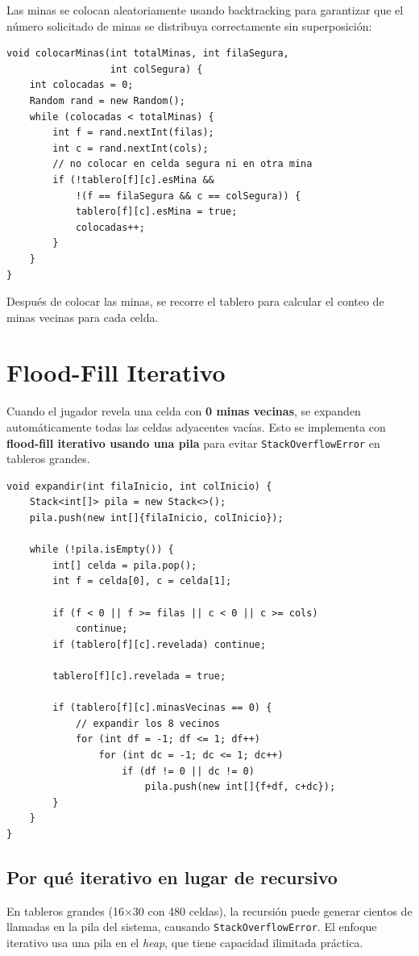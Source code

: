 \documentclass[12pt,a4paper]{article}
\begin{document}
Las minas se colocan aleatoriamente usando backtracking para garantizar que el número solicitado de minas se distribuya correctamente sin superposición:

\begin{lstlisting}
void colocarMinas(int totalMinas, int filaSegura,
                  int colSegura) {
    int colocadas = 0;
    Random rand = new Random();
    while (colocadas < totalMinas) {
        int f = rand.nextInt(filas);
        int c = rand.nextInt(cols);
        // no colocar en celda segura ni en otra mina
        if (!tablero[f][c].esMina &&
            !(f == filaSegura && c == colSegura)) {
            tablero[f][c].esMina = true;
            colocadas++;
        }
    }
}
\end{lstlisting}

Después de colocar las minas, se recorre el tablero para calcular el conteo de minas vecinas para cada celda.

\section{Flood-Fill Iterativo}

Cuando el jugador revela una celda con \textbf{0 minas vecinas}, se expanden automáticamente todas las celdas adyacentes vacías. Esto se implementa con \textbf{flood-fill iterativo usando una pila} para evitar \texttt{StackOverflowError} en tableros grandes.

\begin{lstlisting}
void expandir(int filaInicio, int colInicio) {
    Stack<int[]> pila = new Stack<>();
    pila.push(new int[]{filaInicio, colInicio});

    while (!pila.isEmpty()) {
        int[] celda = pila.pop();
        int f = celda[0], c = celda[1];

        if (f < 0 || f >= filas || c < 0 || c >= cols)
            continue;
        if (tablero[f][c].revelada) continue;

        tablero[f][c].revelada = true;

        if (tablero[f][c].minasVecinas == 0) {
            // expandir los 8 vecinos
            for (int df = -1; df <= 1; df++)
                for (int dc = -1; dc <= 1; dc++)
                    if (df != 0 || dc != 0)
                        pila.push(new int[]{f+df, c+dc});
        }
    }
}
\end{lstlisting}

\subsection{Por qué iterativo en lugar de recursivo}
En tableros grandes (16×30 con 480 celdas), la recursión puede generar cientos de llamadas en la pila del sistema, causando \texttt{StackOverflowError}. El enfoque iterativo usa una pila en el \textit{heap}, que tiene capacidad ilimitada práctica.
\end{document}
